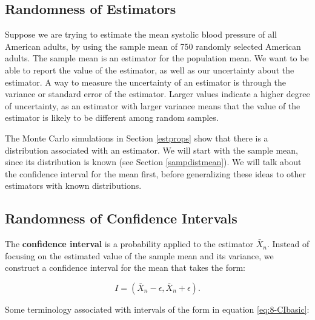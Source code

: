 \documentclass[
]{book}
\begin{document}
\subsection{Randomness of Estimators}\label{randomness-of-estimators}

Suppose we are trying to estimate the mean systolic blood pressure of all American adults, by using the sample mean of 750 randomly selected American adults. The sample mean is an estimator for the population mean. We want to be able to report the value of the estimator, as well as our uncertainty about the estimator. A way to measure the uncertainty of an estimator is through the variance or standard error of the estimator. Larger values indicate a higher degree of uncertainty, as an estimator with larger variance means that the value of the estimator is likely to be different among random samples.

The Monte Carlo simulations in Section \ref{estprops} show that there is a distribution associated with an estimator. We will start with the sample mean, since its distribution is known (see Section \ref{sampdistmean}). We will talk about the confidence interval for the mean first, before generalizing these ideas to other estimators with known distributions.

\subsection{Randomness of Confidence Intervals}\label{randomness-of-confidence-intervals}

The \textbf{confidence interval} is a probability applied to the estimator \(\bar{X}_n\). Instead of focusing on the estimated value of the sample mean and its variance, we construct a confidence interval for the mean that takes the form:

\begin{equation} 
I = \left(\bar{X}_n - \epsilon, \bar{X}_n + \epsilon \right).
\label{eq:8-CIbasic}
\end{equation}

Some terminology associated with intervals of the form in equation \eqref{eq:8-CIbasic}:
\end{document}
